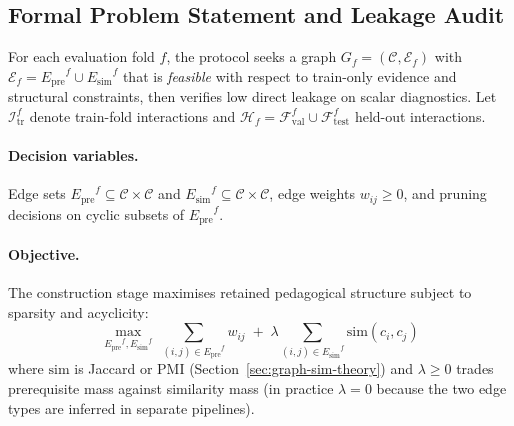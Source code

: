 \documentclass[pdflatex,sn-basic]{sn-jnl}
\newcommand{\Epre}{\ensuremath{E_{\text{pre}}}}
\newcommand{\Esim}{\ensuremath{E_{\text{sim}}}}
\begin{document}
\subsection{Formal Problem Statement and Leakage Audit}
\label{sec:formal-problem}
For each evaluation fold $f$, the protocol seeks a graph
$G_f=(\mathcal{C},\mathcal{E}_f)$ with $\mathcal{E}_f=\Epre^f\cup\Esim^f$
that is \emph{feasible} with respect to train-only evidence and
structural constraints, then verifies low direct leakage on scalar
diagnostics. Let $\mathcal{I}_{\text{tr}}^f$ denote train-fold
interactions and $\mathcal{H}_f=\mathcal{F}_{\text{val}}^f\cup
\mathcal{F}_{\text{test}}^f$ held-out interactions.

\paragraph{Decision variables.}
Edge sets $\Epre^f\subseteq\mathcal{C}\times\mathcal{C}$ and
$\Esim^f\subseteq\mathcal{C}\times\mathcal{C}$, edge weights
$w_{ij}\ge 0$, and pruning decisions on cyclic subsets of $\Epre^f$.

\paragraph{Objective.}
The construction stage maximises retained pedagogical structure subject
to sparsity and acyclicity:
\begin{equation}
\max_{\Epre^f,\Esim^f}\;
\sum_{(i,j)\in\Epre^f} w_{ij}
\;+\;
\lambda \sum_{(i,j)\in\Esim^f} \mathrm{sim}(c_i,c_j)
\label{eq:graph-objective}
\end{equation}
where $\mathrm{sim}$ is Jaccard or PMI (Section~\ref{sec:graph-sim-theory})
and $\lambda\ge 0$ trades prerequisite mass against similarity mass (in
practice $\lambda{=}0$ because the two edge types are inferred in
separate pipelines).
\end{document}
